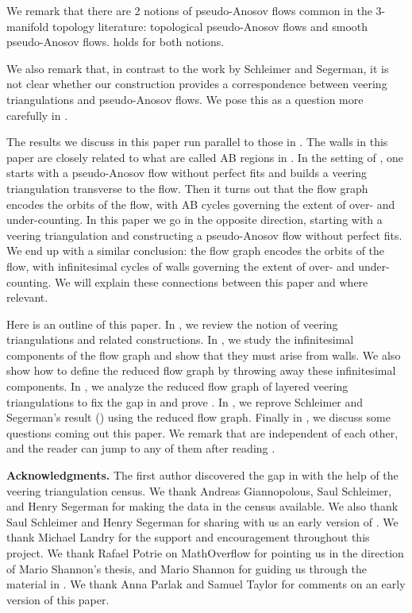\documentclass[12pt]{amsart}
\theoremstyle{definition}
\numberwithin{equation}{section}
\begin{document}
We remark that there are 2 notions of pseudo-Anosov flows common in the 3-manifold topology literature: topological pseudo-Anosov flows and smooth pseudo-Anosov flows.  holds for both notions.

We also remark that, in contrast to the work by Schleimer and Segerman, it is not clear whether our construction provides a correspondence between veering triangulations and pseudo-Anosov flows. We pose this as a question more carefully in .

The results we discuss in this paper run parallel to those in \cite{LMT21}. The walls in this paper are closely related to what are called AB regions in \cite{LMT21}. In the setting of \cite{LMT21}, one starts with a pseudo-Anosov flow without perfect fits and builds a veering triangulation transverse to the flow. Then it turns out that the flow graph encodes the orbits of the flow, with AB cycles governing the extent of over- and under-counting. In this paper we go in the opposite direction, starting with a veering triangulation and constructing a pseudo-Anosov flow without perfect fits. We end up with a similar conclusion: the flow graph encodes the orbits of the flow, with infinitesimal cycles of walls governing the extent of over- and under-counting. We will explain these connections between this paper and \cite{LMT21} where relevant.

Here is an outline of this paper. In , we review the notion of veering triangulations and related constructions. In , we study the infinitesimal components of the flow graph and show that they must arise from walls. We also show how to define the reduced flow graph by throwing away these infinitesimal components. In , we analyze the reduced flow graph of layered veering triangulations to fix the gap in \cite{Ago11} and prove . In , we reprove Schleimer and Segerman's result () using the reduced flow graph. Finally in , we discuss some questions coming out this paper. We remark that  are independent of each other, and the reader can jump to any of them after reading .

{\bf Acknowledgments.} The first author discovered the gap in \cite{Ago11} with the help of the veering triangulation census. We thank Andreas Giannopolous, Saul Schleimer, and Henry Segerman for making the data in the census available. We also thank Saul Schleimer and Henry Segerman for sharing with us an early version of \cite{SS22}. We thank Michael Landry for the support and encouragement throughout this project. We thank Rafael Potrie on MathOverflow for pointing us in the direction of Mario Shannon's thesis, and Mario Shannon for guiding us through the material in . We thank Anna Parlak and Samuel Taylor for comments on an early version of this paper.
\end{document}
